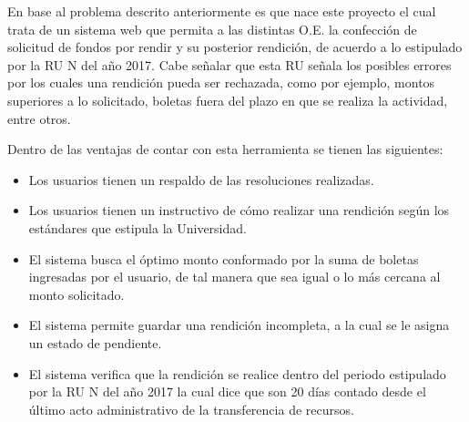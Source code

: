 En base al problema descrito anteriormente es que nace este proyecto el cual trata de un sistema web que permita a las distintas O.E. la confección de solicitud de fondos por rendir y su posterior rendición, de acuerdo a lo estipulado por la RU N del año 2017. Cabe señalar que esta RU señala los posibles errores por los cuales una rendición pueda ser rechazada, como por ejemplo, montos superiores a lo solicitado, boletas fuera del plazo en que se realiza la actividad, entre otros.

Dentro de las ventajas de contar con esta herramienta se tienen las siguientes:

\begin{itemize}
    \item Los usuarios tienen un respaldo de las resoluciones realizadas.
    \item Los usuarios tienen un instructivo de cómo realizar una rendición según los estándares que estipula la Universidad.
    \item El sistema busca el óptimo monto conformado por la suma de boletas ingresadas por el usuario, de tal manera que sea igual o lo más cercana al monto solicitado.
    \item El sistema permite guardar una rendición incompleta, a la cual se le asigna un estado de pendiente.
    \item El sistema verifica que la rendición se realice dentro del periodo estipulado por la RU N del año 2017 la cual dice que son 20 días contado desde el último acto administrativo de la transferencia de recursos.
\end{itemize}

